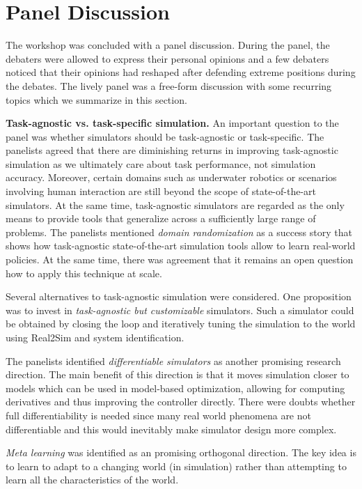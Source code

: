 \section{Panel Discussion}

The workshop was concluded with a panel discussion. During the panel, the debaters were allowed to express their personal opinions and a few debaters noticed that their opinions had reshaped after defending extreme positions during the debates. The lively panel was a free-form discussion with some recurring topics which we summarize in this section.

{\bf Task-agnostic vs. task-specific simulation.}
An important question to the panel was whether simulators should be task-agnostic or task-specific.
The panelists agreed that there are diminishing returns in improving task-agnostic simulation as we ultimately care about task performance, not simulation accuracy. Moreover, certain domains such as underwater robotics or scenarios involving human interaction are still beyond the scope of state-of-the-art simulators. At the same time, task-agnostic simulators are regarded as the only means to provide tools that generalize across a sufficiently large range of problems. The panelists mentioned \emph{domain randomization} as a success story that shows how task-agnostic state-of-the-art simulation tools allow to learn real-world policies. At the same time, there was agreement that it remains an open question how to apply this technique at scale.

Several alternatives to task-agnostic simulation were considered. One proposition was to invest in \emph{task-agnostic but customizable} simulators. Such a simulator could be obtained by closing the loop and iteratively tuning the simulation to the world using Real2Sim and system identification.

The panelists identified \emph{differentiable simulators} as another promising research direction. The main benefit of this direction is that it moves simulation closer to models which can be used in model-based optimization, allowing for computing derivatives and thus improving the controller directly. There were doubts whether full differentiability is needed since many real world phenomena are not differentiable and this would inevitably make simulator design more complex.

\emph{Meta learning} was identified as an promising orthogonal direction. The key idea is to learn to adapt to a changing world (in simulation) rather than attempting to learn all the characteristics of the world.

